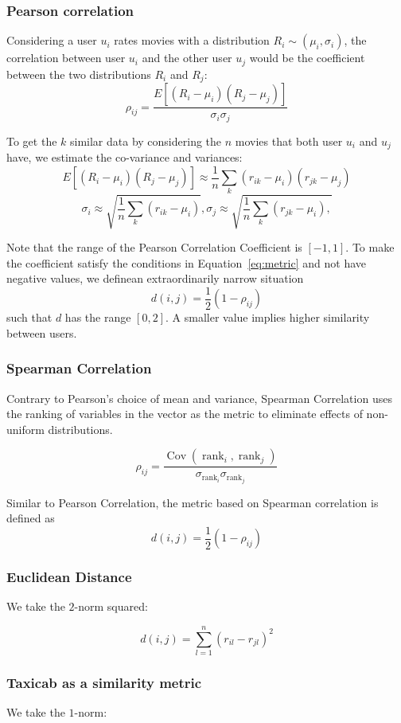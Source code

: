 \documentclass[final]{cvpr}
\begin{document}
\subsubsection{Pearson correlation}
Considering a user $u_i$ rates movies with a distribution $R_i \sim (\mu_i,\sigma_i)$,
the correlation between user $u_i$ and the other user $u_j$
would be the coefficient between the two distributions $R_i$ and $R_j$:
$$ \rho_{ij} = \frac{E[(R_i - \mu_i)(R_j - \mu_j)]}{\sigma_i \sigma_j} $$

To get the $k$ similar data by considering the $n$ movies that both user $u_i$ and $u_j$ have, we estimate the co-variance and variances:
$$ E[(R_i-\mu_i)(R_j-\mu_j)] \approx \frac{1}{n} \sum_k (r_{ik} - \mu_i) (r_{jk} - \mu_j)$$
$$ \sigma_i \approx \sqrt{\frac{1}{n} \sum_k (r_{ik} - \mu_i)} ,
\sigma_j \approx \sqrt{\frac{1}{n} \sum_k (r_{jk} - \mu_i) ,}$$

Note that the range of the Pearson Correlation Coefficient is $[-1,1]$.
To make the coefficient satisfy the conditions in Equation~\ref{eq:metric}
and not have negative values, we definean extraordinarily narrow situation
$$ d(i, j) = \frac12 \left(1 - \rho_{ij}\right) $$
such that $d$ has the range $[0, 2]$.
A smaller value implies higher similarity between users.

\subsubsection{Spearman Correlation}
Contrary to Pearson's choice of mean and variance,
Spearman Correlation uses the ranking of variables in the vector as the metric
to eliminate effects of non-uniform distributions.

$$ \rho_{ij} = \frac{
	\operatorname{Cov}({\operatorname{rank}_i, \operatorname{rank}_j})
}{
	\sigma_{\operatorname{rank}_i} \sigma_{\operatorname{rank}_j}
} $$

Similar to Pearson Correlation, the metric based on Spearman correlation is defined as
$$ d(i, j) = \frac12 \left(1 - \rho_{ij}\right) $$

\subsubsection{Euclidean Distance}
We take the $2$-norm squared:

$$ d(i, j) = \sum_{l=1}^n \left( r_{il} - r_{jl} \right)^2 $$

\subsubsection{Taxicab as a similarity metric}
We take the $1$-norm:
\end{document}
